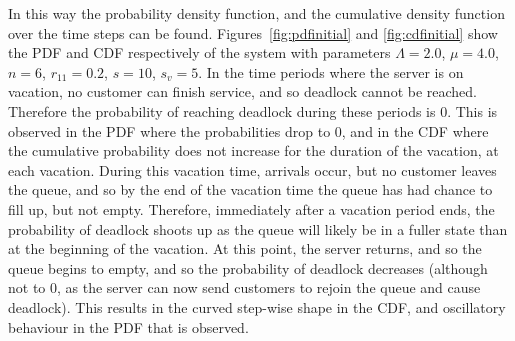 \documentclass{article}
\begin{document}
In this way the probability density function, and the cumulative density function over the time steps can be found.
Figures~\ref{fig:pdfinitial} and \ref{fig:cdfinitial} show the PDF and CDF respectively of the system with parameters $\Lambda = 2.0$, $\mu = 4.0$, $n = 6$, $r_{11} = 0.2$, $s = 10$, $s_v = 5$.
In the time periods where the server is on vacation, no customer can finish service, and so deadlock cannot be reached.
Therefore the probability of reaching deadlock during these periods is $0$.
This is observed in the PDF where the probabilities drop to $0$, and in the CDF where the cumulative probability does not increase for the duration of the vacation, at each vacation.
During this vacation time, arrivals occur, but no customer leaves the queue, and so by the end of the vacation time the queue has had chance to fill up, but not empty.
Therefore, immediately after a vacation period ends, the probability of deadlock shoots up as the queue will likely be in a fuller state than at the beginning of the vacation.
At this point, the server returns, and so the queue begins to empty, and so the probability of deadlock decreases (although not to $0$, as the server can now send customers to rejoin the queue and cause deadlock).
This results in the curved step-wise shape in the CDF, and oscillatory behaviour in the PDF that is observed.
\end{document}
